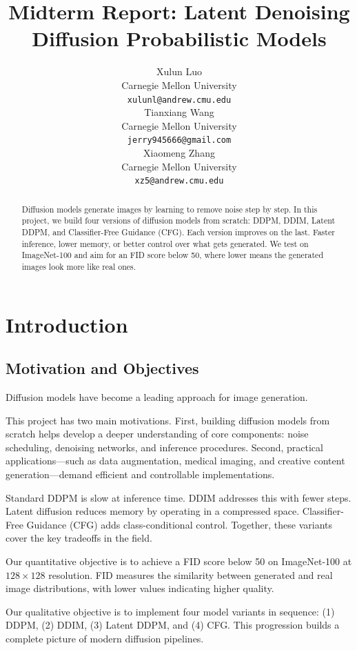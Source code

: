 \documentclass{article}
\title{Midterm Report: Latent Denoising Diffusion Probabilistic Models}
\author{%
  Xulun Luo \\
  Carnegie Mellon University \\
  \texttt{xulunl@andrew.cmu.edu} \\
  \And
  Tianxiang Wang \\
  Carnegie Mellon University\\
  \texttt{jerry945666@gmail.com} \\
  \And
  Xiaomeng Zhang \\
  Carnegie Mellon University \\
  \texttt{xz5@andrew.cmu.edu} \\
}
\begin{document}
\maketitle

\begin{abstract}
Diffusion models generate images by learning to remove noise step by step.
In this project, we build four versions of diffusion models from scratch:
DDPM, DDIM, Latent DDPM, and Classifier-Free Guidance (CFG).
Each version improves on the last. Faster inference, lower memory, or
better control over what gets generated.
We test on ImageNet-100 and aim for an FID score below 50,
where lower means the generated images look more like real ones.
\end{abstract}

\section{Introduction}

\subsection{Motivation and Objectives}

Diffusion models have become a leading approach for image generation.

This project has two main motivations. First, building diffusion models from scratch helps develop a deeper understanding of core components: noise scheduling, denoising networks, and inference procedures. Second, practical applications—such as data augmentation, medical imaging, and creative content generation—demand efficient and controllable implementations.

Standard DDPM is slow at inference time. DDIM addresses this with fewer steps. Latent diffusion reduces memory by operating in a compressed space. Classifier-Free Guidance (CFG) adds class-conditional control. Together, these variants cover the key tradeoffs in the field.

Our quantitative objective is to achieve a FID score below 50 on ImageNet-100 at $128 \times 128$ resolution. FID measures the similarity between generated and real image distributions, with lower values indicating higher quality.

Our qualitative objective is to implement four model variants in sequence: (1) DDPM, (2) DDIM, (3) Latent DDPM, and (4) CFG. This progression builds a complete picture of modern diffusion pipelines.
\end{document}
